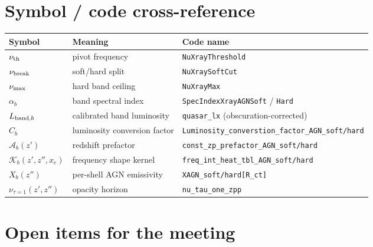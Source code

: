 \documentclass[11pt]{article}
\newcommand{\code}[1]{\texttt{#1}}
\begin{document}
\section{Symbol / code cross-reference}

\begin{center}
\begin{tabular}{@{}lll@{}}
\toprule
Symbol & Meaning & Code name \\
\midrule
$\nu_{\rm th}$ & pivot frequency & \code{NuXrayThreshold} \\
$\nu_{\rm break}$ & soft/hard split & \code{NuXraySoftCut} \\
$\nu_{\rm max}$ & hard band ceiling & \code{NuXrayMax} \\
$\alpha_b$ & band spectral index & \code{SpecIndexXrayAGNSoft} / \code{Hard} \\
$L_{{\rm band},b}$ & calibrated band luminosity & \code{quasar\_lx} (obscuration-corrected) \\
$C_b$ & luminosity conversion factor & \code{Luminosity\_converstion\_factor\_AGN\_soft/hard} \\
$\mathcal{A}_b(z')$ & redshift prefactor & \code{const\_zp\_prefactor\_AGN\_soft/hard} \\
$\mathcal{K}_b(z',z'',x_e)$ & frequency shape kernel & \code{freq\_int\_heat\_tbl\_AGN\_soft/hard} \\
$X_b(z'')$ & per-shell AGN emissivity & \code{XAGN\_soft/hard[R\_ct]} \\
$\nu_{\tau=1}(z',z'')$ & opacity horizon & \code{nu\_tau\_one\_zpp} \\
\bottomrule
\end{tabular}
\end{center}

\section{Open items for the meeting}
\end{document}
